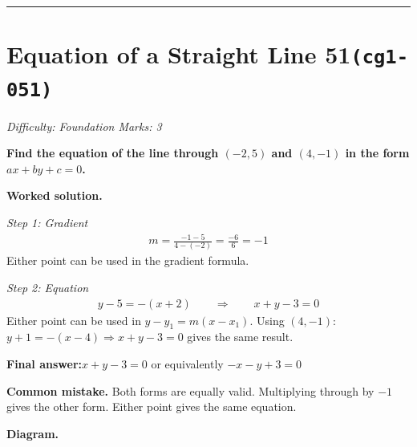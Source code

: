 \documentclass[11pt]{article}
\newcommand{\question}[1]{\par\medskip\noindent\textbf{#1}\par}
\begin{document}
\medskip\hrule

\section*{Equation of a Straight Line 51\quad\small\texttt{(cg1-051)}}
\textit{Difficulty: Foundation \quad\textbar\quad Marks: 3}

\question{Find the equation of the line through \( (-2, 5) \) and \( (4, -1) \) in the form \( ax + by + c = 0 \).}

\textbf{Worked solution.}

\textit{Step 1: Gradient}
\[\begin{gathered}
m = \frac{-1-5}{4-(-2)} = \frac{-6}{6} = -1
\end{gathered}\]
Either point can be used in the gradient formula.

\textit{Step 2: Equation}
\[\begin{gathered}
y - 5 = -(x + 2) \quad\quad \Rightarrow \quad\quad x + y - 3 = 0
\end{gathered}\]
Either point can be used in \(y - y_1 = m(x - x_1)\). Using \((4, -1)\): \(y + 1 = -(x - 4) \Rightarrow x + y - 3 = 0\) gives the same result.

\begin{answerbox}
\textbf{Final answer:}\quad \(\displaystyle x + y - 3 = 0\) or equivalently \(\displaystyle -x - y + 3 = 0\)
\end{answerbox}
\textbf{Common mistake.} Both forms are equally valid. Multiplying through by \(-1\) gives the other form. Either point gives the same equation.

\textbf{Diagram.}
\end{document}
